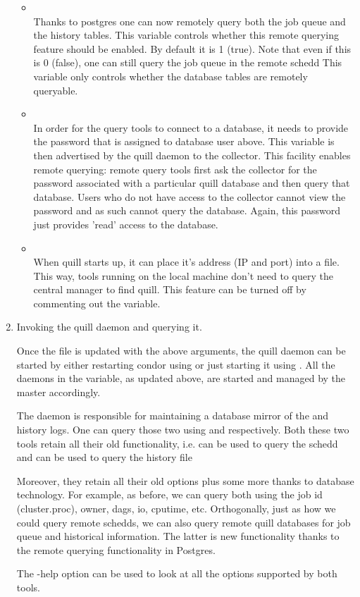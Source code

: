 \begin{enumerate}
\begin{itemize}
\item {}\\
Thanks to postgres one can now remotely query both the job queue and the
history tables. This variable controls whether this remote querying 
feature should be enabled.  By default it is 1 (true).  Note that even if 
this is 0 (false), one can still query the job queue in the remote schedd
This variable only controls whether the database tables are remotely queryable.

\item {}\\
In order for the query tools to connect to a database, it needs to provide
the password that is assigned to database user  above. 
This variable is then advertised by the quill daemon to the collector.  
This facility enables remote querying: remote  query tools first 
ask the collector for the password associated with a particular quill database 
and then query that database.  Users who do not have access to the collector 
cannot view the password and as such cannot query the database.  Again, this 
password just provides 'read' access to the database.

\item {}\\
When quill starts up, it can place it's address (IP and port)
into a file.  This way, tools running on the local machine don't
need to query the central manager to find quill.  This 
feature can be turned off by commenting out the variable.

\end{itemize}

\item Invoking the quill daemon and querying it.

Once the  file is updated with the above arguments,
the quill daemon can be started by either restarting condor using
 or just starting it using .  All the
daemons in the  variable, as updated above, are
started and managed by the master accordingly.

The  daemon is responsible for maintaining a database
mirror of the  and history logs.  One can query those two
using  and  respectively.  Both these two tools
retain all their old functionality, i.e.  can be used to query
the schedd and  can be used to query the history file

Moreover, they retain all their old options plus some more thanks to
database technology.  For example, as before, we can query both using
the job id (cluster.proc), owner, dags, io, cputime, etc.  Orthogonally,
just as how we could query remote schedds, we can also query remote quill
databases for job queue and historical information.  The latter is new
functionality thanks to the remote querying functionality in Postgres.

The -help option can be used to look at all the options supported by
both tools.
\end{enumerate}


